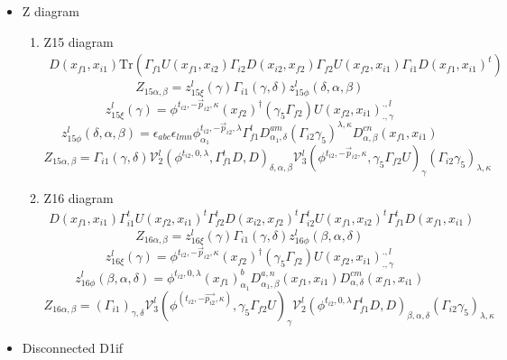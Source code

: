\documentclass{article}[12pt]
\begin{document}
\begin{itemize}
\begin{enumerate}
\end{enumerate}
\item Z diagram
\begin{enumerate}
\item Z15 diagram
\begin{eqnarray}
D(x_{f1},x_{i1})\mathrm{Tr}(\Gamma_{f1}U(x_{f1},x_{i2})\Gamma_{i2}D(x_{i2},x_{f2})\Gamma_{f2}U(x_{f2},x_{i1})\Gamma_{i1}D\left(x_{f1},x_{i1}\right)^t)
\end{eqnarray}
$$
Z_{15\alpha,\beta}=z_{15\xi}^{l}\left(\gamma\right)\Gamma_{i1}\left(\gamma,\delta\right)z_{15\phi}^{l}\left(\delta,\alpha,\beta\right)
$$
$$
z_{15\xi}^{l}\left(\gamma\right)=
\phi^{t_{i2},-\vec{p}_{i2},\kappa}\left(x_{f2}\right)^{\dagger}\left(\gamma_5\Gamma_{f2}\right)U\left(x_{f2},x_{i1}\right)^{.,l}_{.,\gamma}
$$
$$
z_{15\phi}^{l}\left(\delta,\alpha,\beta\right)=\epsilon_{abc}\epsilon_{lmn}\phi^{t_{i2},-\vec{p}_{i2},\lambda}_{\alpha_1}\Gamma_{f1}^{t}D^{am}_{\alpha_1,\delta}\left(\Gamma_{i2}\gamma_5\right)^{\lambda,\kappa}D^{cn}_{\alpha,\beta}\left(x_{f1},x_{i1}\right)
$$
$$
Z_{15\alpha,\beta}=\Gamma_{i1}\left(\gamma,\delta\right){\mathcal V}^{l}_{2}\left(\phi^{t_{i2},0,\lambda},\Gamma_{f1}^tD,D\right)_{\delta,\alpha,\beta}{\mathcal V}^{l}_{3}\left(\phi^{t_{i2},-\vec{p}_{i2},\kappa},\gamma_5\Gamma_{f2}U\right)_{\gamma}\left(\Gamma_{i2}\gamma_5\right)_{\lambda,\kappa}
$$
\item Z16 diagram
\begin{eqnarray}
D(x_{f1},x_{i1})\Gamma_{i1}^tU(x_{f2},x_{i1})^t\Gamma_{f2}^tD(x_{i2},x_{f2})^t\Gamma_{i2}^tU(x_{f1},x_{i2})^t\Gamma_{f1}^tD(x_{f1},x_{i1})
\end{eqnarray}
$$
Z_{16\alpha,\beta}=z_{16\xi}^{l}\left(\gamma\right)\Gamma_{i1}\left(
\gamma,\delta\right)z_{16\phi}^{l}\left(\beta,\alpha,\delta\right)
$$
$$
z_{16\xi}^{l}\left(\gamma\right)=\phi^{t_{i2},-\vec{p}_{i2},\kappa}\left(x_{f2}\right)^{\dagger}\left(\gamma_5\Gamma_{f2}\right)U\left(x_{f2},x_{i1}\right)^{.,l}_{.,\gamma}
$$
$$
z_{16\phi}^{l}\left(\beta,\alpha,\delta\right)=\phi^{t_{i2},0,\lambda}\left(x_{f1}\right)^{b}_{\alpha_1}D_{\alpha_1,\beta}^{a,n}\left(x_{f1},x_{i1}\right)D^{cm}_{\alpha,\delta}\left(x_{f1},x_{i1}\right)
$$
$$
Z_{16\alpha,\beta}=\left(\Gamma_{i1}\right)_{\gamma,\delta}{\mathcal V}_{3}^{l}\left(\phi^{\left(t_{i2},-\vec{p_{i2}},\kappa\right)},\gamma_5\Gamma_{f2}U\right)_{\gamma}{\mathcal V}_{2}^{l}\left(\phi^{t_{i2},0,\lambda}\Gamma_{f1}^{t}D,D\right)_{\beta,\alpha,\delta}\left(\Gamma_{i2}\gamma_5\right)_{\lambda,\kappa}
$$
\end{enumerate}
\item Disconnected D1if\\

\end{itemize}
\end{document}
